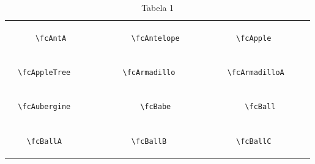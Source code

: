 \documentclass[x11names]{article}
\begin{document}
\begin{table}[H]
\begin{tabular}{|c|c|c|c|c|c|}
		&\multirow{5}{*}{	\fcAntA	[scale=0.16]} & &\multirow{5}{*}{	\fcAntelope	[scale=0.16]} & &\multirow{5}{*}{	\fcApple	[scale=0.64]}\\	& & & & & \\	& & & & & \\	\verb|	\fcAntA	| & & \verb|	\fcAntelope	| & & \verb|	\fcApple	| & \\	& & & & & \\	& & & & & \\	& & & & & \\	\hline									
		&\multirow{5}{*}{	\fcAppleTree	[scale=0.16]} & &\multirow{5}{*}{	\fcArmadillo	[scale=0.09]} & &\multirow{5}{*}{	\fcArmadilloA	[scale=0.09]}\\	& & & & & \\	& & & & & \\	\verb|	\fcAppleTree	| & & \verb|	\fcArmadillo	| & & \verb|	\fcArmadilloA	| & \\	& & & & & \\	& & & & & \\	& & & & & \\	\hline									
		&\multirow{5}{*}{	\fcAubergine	[scale=0.16]} & &\multirow{5}{*}{	\fcBabe	[scale=0.16]} & &\multirow{5}{*}{	\fcBall	[scale=0.64]}\\	& & & & & \\	& & & & & \\	\verb|	\fcAubergine	| & & \verb|	\fcBabe	| & & \verb|	\fcBall	| & \\	& & & & & \\	& & & & & \\	& & & & & \\	\hline									
		&\multirow{5}{*}{	\fcBallA	[scale=0.16]} & &\multirow{5}{*}{	\fcBallB	[scale=0.16]} & &\multirow{5}{*}{	\fcBallC	[scale=0.16]}\\	& & & & & \\	& & & & & \\	\verb|	\fcBallA	| & & \verb|	\fcBallB	| & & \verb|	\fcBallC	| & \\	& & & & & \\	& & & & & \\	& & & & & \\		\hline 	\hline 	\end{tabular}	\caption{	Tabela 1	}\label{Tab1}\end{table}
\end{document}
